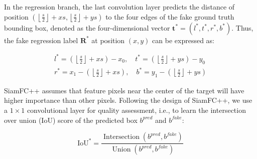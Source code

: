 \documentclass[journal]{IEEEtran}
\begin{document}
In the regression branch, the last convolution layer predicts the distance of position $\left(\left\lfloor\frac{s}{2}\right\rfloor+x s,\left\lfloor\frac{s}{2}\right\rfloor+y s\right)$ to the four edges of the fake ground truth bounding box, denoted as the four-dimensional vector $\boldsymbol{t}^{*}=\left(l^{*}, t^{*}, r^{*}, b^{*}\right)$. Thus, the fake regression label $\textbf{R}^*$ at position $(x,y)$ can be expressed as:

\begin{equation}
  \begin{array}{ll}
  l^{*}=\left(\left\lfloor\frac{s}{2}\right\rfloor+x s\right)-x_{0}, \quad t^{*}=\left(\left\lfloor\frac{s}{2}\right\rfloor+y s\right)-y_{0} \\
  r^{*}=x_{1}-\left(\left\lfloor\frac{s}{2}\right\rfloor+x s\right), \quad b^{*}=y_{1}-\left(\left\lfloor\frac{s}{2}\right\rfloor+y s\right)
  \end{array}
\end{equation}

SiamFC++ assumes that feature pixels near the center of the target will have higher importance than other pixels. Following the design of SiamFC++, we use a $1 \times 1$ convolutional layer for quality assessment, i.e., to learn the intersection over union (IoU) score of the predicted box $b^{pred}$ and $b^{fake}$:

\begin{equation}
  \mathrm{IoU}^{*}=\frac{\operatorname{ Intersection }\left(b^{pred}, b^{fake}\right)}{\operatorname{Union}\left(b^{pred}, b^{fake}\right)}
\end{equation}
\end{document}
